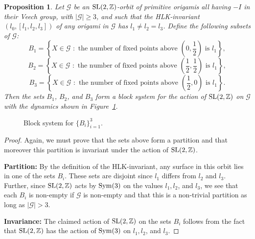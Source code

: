 \documentclass[a4paper,11pt]{amsart}
\numberwithin{equation}{section}
\numberwithin{figure}{section}
\numberwithin{table}{section}
\newtheorem{proposition}[theorem]{Proposition}
\newcommand{\Z}{\mathbb{Z}}
\newcommand{\orb}{\mathcal{G}}
\DeclareMathOperator{\SL}{{\rm{SL}}}
\DeclareMathOperator{\Sym}{{\rm{Sym}}}
\begin{document}
\begin{proposition}\label{prop:l_1diff}
Let $\orb$ be an $\SL(2,\Z)$-orbit of primitive origamis all having $-I$ in their Veech group, with $|\orb|\geq3$, and such that the HLK-invariant $(l_{0},[l_{1},l_{2},l_{3}])$ of any origami in $\orb$ has $l_{1}\neq l_{2} =l_{3}$. Define the following subsets of $\orb$:
\[B_{1} = \left\{X \in \orb\,\,: \,\,\text{the number of fixed points above }\left(0,\frac{1}{2}\right)\text{ is }l_{1}\right\},\]
\[B_{2} = \left\{X\in \orb\,\,:\,\,\text{the number of fixed points above }\left(\frac{1}{2},\frac{1}{2}\right)\text{ is }l_{1}\right\},\]
\[B_{3} = \left\{X\in \orb\,\,:\,\,\text{the number of fixed points above }\left(\frac{1}{2},0\right)\text{ is }l_{1}\right\}.\]
Then the sets $B_{1}$, $B_{2}$, and $B_{3}$ form a block system for the action of $\SL(2,\Z)$ on $\orb$ with the dynamics shown in Figure~\ref{fig:blocksys4}.
\end{proposition}

\begin{figure}[t]
\begin{center}
\end{center}
\caption{Block system for $\{B_{i}\}_{i = 1}^{3}$.}
\label{fig:blocksys4}
\end{figure}

\begin{proof}
Again, we must prove that the sets above form a partition and that moreover this partition is invariant under the action of $\SL(2,\Z)$.

{\bf Partition:} By the definition of the HLK-invariant, any surface in this orbit lies in one of the sets $B_{i}$. These sets are disjoint since $l_{1}$ differs from $l_{2}$ and $l_{3}$. Further, since $\SL(2,\Z)$ acts by $\Sym(3)$ on the values $l_{1},l_{2}$, and $l_{3}$, we see that each $B_{i}$ is non-empty if $\orb$ is non-empty and that this is a non-trivial partition as long as $|\orb|>3$.

{\bf Invariance:} The claimed action of $\SL(2,\Z)$ on the sets $B_{i}$ follows from the fact that $\SL(2,\Z)$ has the action of $\Sym(3)$ on $l_{1}, l_{2}$, and $l_{3}$.
\end{proof}
\end{document}
